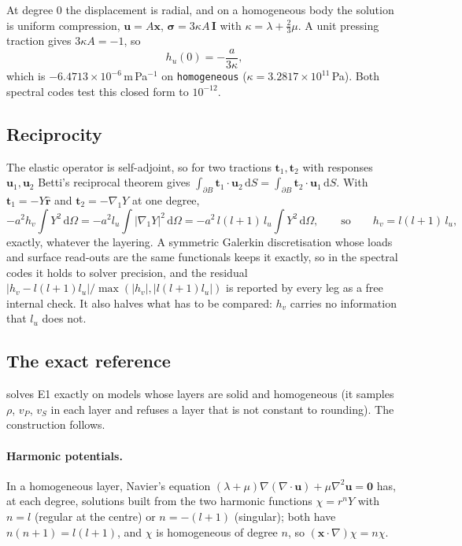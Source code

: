 \documentclass[11pt]{article}
\numberwithin{equation}{section}
\newcommand{\dS}{\,\mathrm{d}S}
\newcommand{\vu}{\mathbf{u}}
\newcommand{\vx}{\mathbf{x}}
\newcommand{\vt}{\mathbf{t}}
\newcommand{\rhat}{\hat{\mathbf{r}}}
\newcommand{\code}[1]{\texttt{#1}}
\newcommand{\gradone}{\nabla_{1}}
\newcommand{\bsig}{\bm{\sigma}}
\begin{document}
At degree 0 the displacement is radial, and on a homogeneous body the
solution is uniform compression, $\vu = A\vx$, $\bsig = 3\kappa A\,\mathbf
I$ with $\kappa=\lambda+\tfrac23\mu$. A unit pressing traction gives
$3\kappa A=-1$, so
\begin{equation}
  h_u(0) = -\frac{a}{3\kappa},
  \label{eq:degree0}
\end{equation}
which is $-6.4713\times10^{-6}$\,m\,Pa$^{-1}$ on \code{homogeneous}
($\kappa = 3.2817\times10^{11}$\,Pa). Both spectral codes test this closed
form to $10^{-12}$.

\subsection{Reciprocity}
\label{sec:e1-reciprocity}

The elastic operator is self-adjoint, so for two tractions $\vt_1,\vt_2$
with responses $\vu_1,\vu_2$ Betti's reciprocal theorem gives
$\int_{\partial B}\vt_1\cdot\vu_2\dS = \int_{\partial B}\vt_2\cdot\vu_1\dS$.
With $\vt_1=-Y\rhat$ and $\vt_2=-\gradone Y$ at one degree,
\begin{equation}
  -a^2 h_v\!\int Y^2\,\mathrm{d}\Omega
  = -a^2 l_u\!\int |\gradone Y|^2\,\mathrm{d}\Omega
  = -a^2\, l(l+1)\, l_u\!\int Y^2\,\mathrm{d}\Omega ,
  \qquad\text{so}\qquad
  h_v = l(l+1)\,l_u ,
  \label{eq:reciprocity}
\end{equation}
exactly, whatever the layering. A symmetric Galerkin discretisation whose
loads and surface read-outs are the same functionals keeps it exactly, so in
the spectral codes it holds to solver precision, and the residual
$|h_v - l(l+1)l_u|/\max(|h_v|,|l(l+1)l_u|)$ is reported by every leg as a
free internal check. It also halves what has to be compared: $h_v$ carries
no information that $l_u$ does not.

\subsection{The exact reference}
\label{sec:e1-exact}

 solves E1 exactly on models whose
layers are solid and homogeneous (it samples $\rho$, $v_P$, $v_S$ in each
layer and refuses a layer that is not constant to rounding). The
construction follows.

\paragraph{Harmonic potentials.}
In a homogeneous layer, Navier's equation
$(\lambda+\mu)\nabla(\nabla\cdot\vu)+\mu\nabla^2\vu=\mathbf 0$ has, at
each degree, solutions built from the two harmonic functions
$\chi = r^{n}Y$ with $n=l$ (regular at the centre) or $n=-(l+1)$
(singular); both have $n(n+1)=l(l+1)$, and $\chi$ is homogeneous of degree
$n$, so $(\vx\cdot\nabla)\chi = n\chi$.
\end{document}
